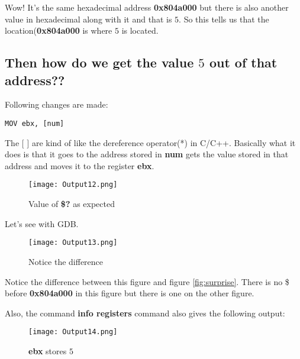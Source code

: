 \documentclass{article}
\makeatletter
\renewcommand\paragraph{\@startsection{paragraph}{4}{\z@}{-3.25ex \@plus -1ex \@minus -.2ex}{1.5ex \@plus .2ex}{\normalfont\normalsize\bfseries}}
\makeatother
\begin{document}
\newpage
Wow! It's the same hexadecimal address \textbf{0x804a000} but there is also another value in hexadecimal along with it and that is $5$. So this tells us that the location(\textbf{0x804a000} is where $5$ is located.

\subsection{Then how do we get the value $5$ out of that address??}\label{sec:howto}
\paragraph{}

Following changes are made:
\begin{Verbatim}[frame=single]
MOV ebx, [num]
\end{Verbatim}
The $\lbrack$ $\rbrack$ are kind of like the dereference operator(*) in C/C++. Basically what it does is that it goes to the address stored in \textbf{num} gets the value stored in that address and moves it to the register \textbf{ebx}.

\begin{figure}[h]
\centering
\texttt{[image: Output12.png]}
\caption{Value of \textbf{\$?} as expected}
\end{figure}

Let's see with GDB.

\begin{figure}[h]
\centering
\texttt{[image: Output13.png]}
\caption{Notice the difference}
\end{figure}

Notice the difference between this figure and figure \ref{fig:surprise}. There is no \$ before \textbf{0x804a000} in this figure but there is one on the other figure.

\newpage
Also, the command \textbf{info registers} command also gives the following output:
\begin{figure}[h]
\centering
\texttt{[image: Output14.png]}
\caption{\textbf{ebx} stores $5$}
\end{figure}
\end{document}
